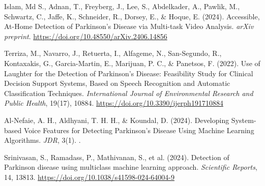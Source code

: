 \documentclass[listof=nochaptergap,12pt,times,authoryear]{report}
\begin{document}
\begin{thebibliography}{99}
Islam, Md S., Adnan, T., Freyberg, J., Lee, S., Abdelkader, A., Pawlik, M., Schwartz, C., Jaffe, K., Schneider, R., Dorsey, E., \& Hoque, E. (2024). Accessible, At-Home Detection of Parkinson's Disease via Multi-task Video Analysis. \textit{arXiv preprint}. \url{https://doi.org/10.48550/arXiv.2406.14856}



Terriza, M., Navarro, J., Retuerta, I., Alfageme, N., San-Segundo, R., Kontaxakis, G., Garcia-Martin, E., Marijuan, P. C., \& Panetsos, F. (2022). Use of Laughter for the Detection of Parkinson's Disease: Feasibility Study for Clinical Decision Support Systems, Based on Speech Recognition and Automatic Classification Techniques. \textit{International Journal of Environmental Research and Public Health}, 19(17), 10884. \url{https://doi.org/10.3390/ijerph191710884}

Al-Nefaie, A. H., Aldhyani, T. H. H., \& Koundal, D. (2024). Developing System-based Voice Features for Detecting Parkinson’s Disease Using Machine Learning Algorithms. \textit{JDR}, 3(1). .

Srinivasan, S., Ramadass, P., Mathivanan, S., et al. (2024). Detection of Parkinson disease using multiclass machine learning approach. \textit{Scientific Reports}, 14, 13813. \url{https://doi.org/10.1038/s41598-024-64004-9}

\end{thebibliography}
\end{document}
